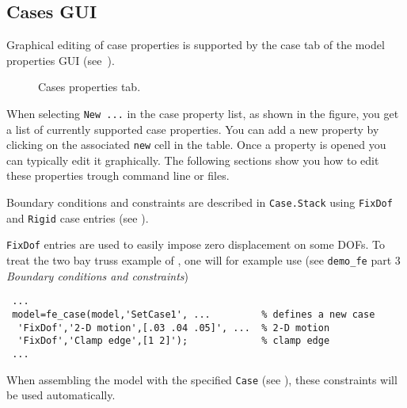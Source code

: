 \begin{SDT}
\subsection{Cases GUI}

Graphical editing of case properties is supported by the case tab of the model properties GUI (see~).

\begin{figure}[H]
\centering
{}
 \caption{Cases properties tab.}
  \label{fig:feplot_case}
\end{figure}

When selecting {\tt New ...} in the case property list, as shown in the figure, you get a list of currently supported case properties. You can add a new property by clicking on the associated {\tt new} cell in the table. Once a property is opened you can typically edit it graphically. The following sections show you how to edit these properties trough command line or  files.
\end{SDT}

Boundary conditions and constraints are described in {\tt Case.Stack} using {\tt FixDof} and {\tt Rigid} case entries (see ).

{\tt FixDof} entries are used to easily impose zero displacement on some DOFs. To treat the two bay truss example of , one will for example use (see {\tt demo\_fe} part 3 {\sl Boundary conditions and constraints})

\begin{verbatim}
 ...
 model=fe_case(model,'SetCase1', ...         % defines a new case
  'FixDof','2-D motion',[.03 .04 .05]', ...  % 2-D motion 
  'FixDof','Clamp edge',[1 2]');             % clamp edge
 ...
\end{verbatim}

When assembling the model with the specified {\tt Case} (see ), these constraints will be used automatically.

